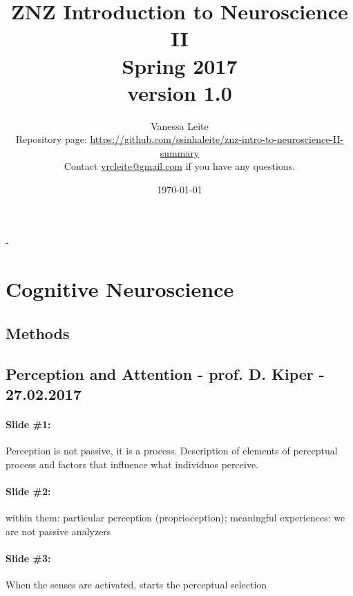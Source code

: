 \documentclass[12pt,article,oneside,a4paper]{memoir}
\title{\textbf{ZNZ Introduction to Neuroscience II} \\
       Spring 2017\\\normalsize version 1.0}
\author{
	Vanessa Leite
	\vspace{2em}
	\\Repository page: \url{https://github.com/ssinhaleite/znz-intro-to-neuroscience-II-summary}\\
	Contact \href{mailto:vrcleite@gmail.com}{vrcleite@gmail.com} if you have any questions.}
\date{\today}
\begin{document}
\frontmatter


\begin{titlingpage}
  \calccentering{\unitlength}
  \begin{adjustwidth*}{\unitlength-24pt}{-\unitlength-24pt}
    \maketitle
  \end{adjustwidth*}
\end{titlingpage}

\mainmatter



\newpage
\clearpage
{}
\setcounter{tocdepth}{3}
\setcounter{secnumdepth}{2}
\tableofcontents

\clearpage
{}

\section{Cognitive Neuroscience}
\subsection{Methods}

\subsection{Perception and Attention - prof. D. Kiper - 27.02.2017}
\paragraph{Slide \#1:} Perception is not passive, it is a process. Description of elements of perceptual process and factors that influence what individuos perceive.
\paragraph{Slide \#2:} within them: particular perception (proprioception); meaningful experiences: we are not passive analyzers
\paragraph{Slide \#3:} When the senses are activated, starts the perceptual selection
\end{document}
